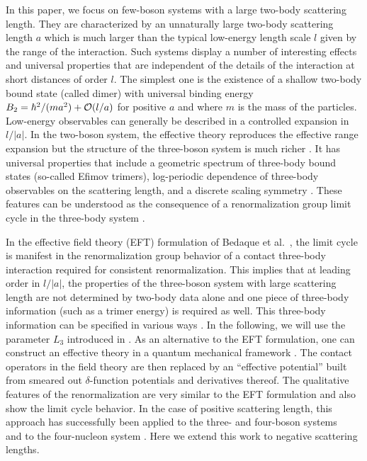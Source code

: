 \documentclass[prc,preprint,showpacs,tightenlines,%
nofootinbib]{revtex4}
\begin{document}
In this paper, we focus on
few-boson systems with a large two-body scattering length.
They are characterized by an unnaturally large two-body scattering length $a$
which is much larger than the typical low-energy length scale $l$ given
by the range of the interaction. Such systems
display a number of interesting effects and universal properties that are 
independent of the details of the interaction at short distances of order $l$. 
The simplest one is the existence of a shallow two-body bound state 
(called dimer) with universal binding energy 
$B_2=\hbar^2/(ma^2)+{\cal O}(l/a)$
for positive $a$ and where $m$ is the mass of the particles. 
Low-energy observables can generally be described in a controlled expansion 
in $l/|a|$. In the two-boson system, the effective 
theory reproduces the effective range expansion but
the structure of the three-boson system is much richer \cite{Braaten:2004rn}.
It has universal properties that include a geometric spectrum of 
three-body bound states (so-called Efimov trimers),
log-periodic dependence of three-body observables on the scattering length,
and a discrete scaling symmetry \cite{Efimov71,Efimov79}. 
These features can be understood as the consequence of a  
renormalization group limit cycle in the three-body system
\cite{Bedaque:1998kg,Bedaque:1998km,Mohr:2005pv}. 

In the effective field theory (EFT) formulation of Bedaque et 
al.~\cite{Bedaque:1998kg,Bedaque:1998km}, 
the limit cycle is manifest in the renormalization group behavior
of a contact three-body interaction required for consistent renormalization.
This implies that at leading order in $l/|a|$, the properties of the 
three-boson system with large scattering length are not determined by 
two-body data alone and one piece of three-body information 
(such as a trimer energy) is required as well.
This three-body information can be specified in various ways
\cite{Braaten:2004rn,Bedaque:1998kg,Bedaque:1998km,Mohr:2005pv,Afnan:2003bs,Platter:2006ev,Platter:2006ad,Platter04}. 
In the following, we will use the parameter $L_3$ introduced
in \cite{Platter04}.
As an alternative to the EFT formulation, one can construct an 
effective theory in a quantum mechanical framework \cite{Lepage:1997cs}.
The contact operators in the field theory are then replaced by 
an ``effective potential'' built from smeared out
$\delta$-function potentials and derivatives thereof. 
The qualitative features of the renormalization are very similar to the 
EFT formulation and also show the limit cycle behavior.
In the case of positive scattering length, this approach has 
successfully been applied to the three-
and four-boson systems ~\cite{Mohr:2003du,Mohr:2005pv,Platter04}
and to the four-nucleon system \cite{Platter:2004zs}.
Here we extend this work to negative scattering lengths.
\end{document}
